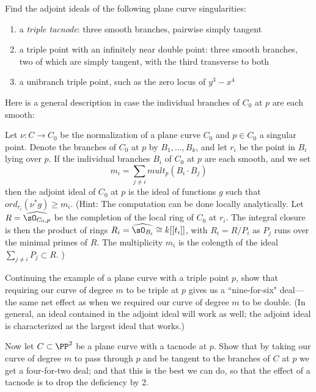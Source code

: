 \begin{exercise}
Find the adjoint ideals of the following plane curve singularities:
\begin{enumerate}
\item a \emph{triple tacnode}: three smooth branches, pairwise simply tangent
\item a triple point with an infinitely near double point: three smooth branches, two of which are simply tangent, with the third transverse to both
\item a unibranch triple point, such as the zero locus of $y^3-x^4$
\end{enumerate}
\end{exercise}

Here is a  general description in case the individual branches of $C_0$ at $p$ are each smooth:

\begin{exercise}
Let $\nu : C \to C_0$ be the normalization of a plane curve $C_0$ and $p \in C_0$ a singular point. Denote the branches of $C_0$ at $p$ by $B_1,\dots,B_k$, and let $r_i$ be the point in $B_i$ lying over $p$. If the individual branches $B_i$ of $C_0$ at $p$ are each smooth, and we set
$$
m_i = \sum_{j \neq i} mult_p(B_i \cdot B_j)
$$
then the adjoint ideal of $C_0$ at $p$ is the ideal of functions $g$ such that $ord_{r_i}(\nu^*g) \geq m_i$.
(Hint: The computation can be done locally analytically. Let $R = \widehat{\sO_{C_0, p}}$ be the completion of the local ring
of $C_0$ at $r_i$. The integral closure is then the product of rings $R_i = \widehat{\sO_{B_i}} \cong k[[t_i]]$,
with $R_i = R/P_i$ as $P_j$ runs over the minimal primes of $R$. The multiplicity
$m_i$ is the colength of the ideal $\sum_{j\neq i}P_j \subset R$.
)
\end{exercise}

\begin{exercise}
Continuing the example of a plane curve with a triple point $p$, show that requiring our curve of degree $m$ to be triple at $p$ gives us a ``nine-for-six" deal---the same net effect as when we required our curve of degree $m$ to be double. (In general, an ideal contained in the adjoint ideal will work as well; the adjoint ideal is characterized as the largest ideal that works.)
\end{exercise}

\begin{exercise}
Now let $C \subset \PP^2$ be a plane curve with a tacnode at $p$. Show that by taking our curve of degree $m$ to pass through $p$ and be tangent to the branches of $C$ at $p$ we get a four-for-two deal; and that this is the best we can do, so that the effect of a tacnode is to drop the deficiency by 2.
\end{exercise}


